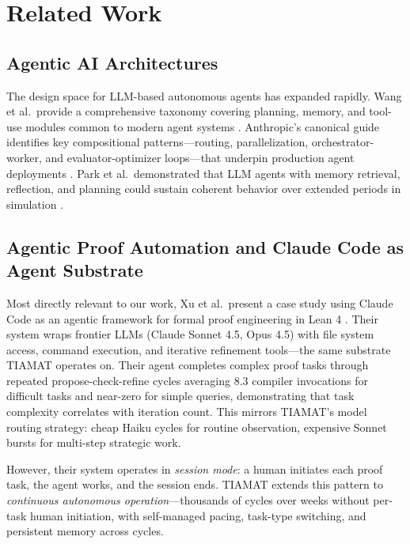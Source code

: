 \documentclass[11pt,a4paper]{article}
\begin{document}
\section{Related Work}
\label{sec:related}

\subsection{Agentic AI Architectures}
The design space for LLM-based autonomous agents has expanded rapidly. Wang et al.\ provide a comprehensive taxonomy covering planning, memory, and tool-use modules common to modern agent systems \cite{wang2024survey}. Anthropic's canonical guide identifies key compositional patterns---routing, parallelization, orchestrator-worker, and evaluator-optimizer loops---that underpin production agent deployments \cite{anthropic2025agents}. Park et al.\ demonstrated that LLM agents with memory retrieval, reflection, and planning could sustain coherent behavior over extended periods in simulation \cite{park2023generative}.

\subsection{Agentic Proof Automation and Claude Code as Agent Substrate}
Most directly relevant to our work, Xu et al.\ present a case study using Claude Code as an agentic framework for formal proof engineering in Lean 4 \cite{xu2026agentic}. Their system wraps frontier LLMs (Claude Sonnet 4.5, Opus 4.5) with file system access, command execution, and iterative refinement tools---the same substrate TIAMAT operates on. Their agent completes complex proof tasks through repeated propose-check-refine cycles averaging 8.3 compiler invocations for difficult tasks and near-zero for simple queries, demonstrating that task complexity correlates with iteration count. This mirrors TIAMAT's model routing strategy: cheap Haiku cycles for routine observation, expensive Sonnet bursts for multi-step strategic work.

However, their system operates in \textit{session mode}: a human initiates each proof task, the agent works, and the session ends. TIAMAT extends this pattern to \textit{continuous autonomous operation}---thousands of cycles over weeks without per-task human initiation, with self-managed pacing, task-type switching, and persistent memory across cycles.
\end{document}
